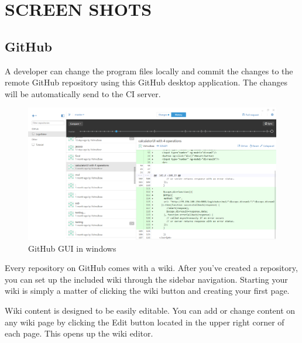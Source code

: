 \documentclass[12pt,a4paper,oneside]{report}
\begin{document}
{\section{SCREEN SHOTS}
\subsection{GitHub}
\par A developer can change the program files locally and commit the changes to the remote GitHub repository using this GitHub desktop application. The changes will be automatically send to the CI server.
\begin{figure}[h]
\begin{center}
\includegraphics[scale=.47]{git.png}
\caption{GitHub GUI in windows}
\label{GitHub GUI in windows}
\end{center}
\end{figure}

\par Every repository on GitHub comes with a wiki. After you’ve created a repository, you can set up the included wiki through the sidebar navigation. Starting your wiki is simply a matter of clicking the wiki button and creating your first page.
\par Wiki content is designed to be easily editable. You can add or change content on any wiki page by clicking the Edit button located in the upper right corner of each page. This opens up the wiki editor.


}
\end{document}
